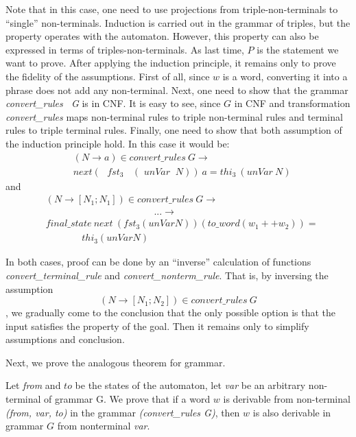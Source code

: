 Note that in this case, one need to use projections from triple-non-terminals to ``single'' non-terminals. Induction is carried out in the grammar of triples, but the property operates with the automaton. However, this property can also be expressed in terms of triples-non-terminals.
As last time, $P$ is the statement we want to prove.
After applying the induction principle, it remains only to prove the fidelity of the assumptions.
First of all, since $ w $ is a word, converting it into a phrase does not add any non-terminal.
Next, one need to show that the grammar \textit{convert\_rules \ G} is in CNF. It is easy to see, since $G$ in CNF and transformation \textit{convert\_rules} maps non-terminal rules to triple non-terminal rules and terminal rules to triple terminal rules.
Finally, one need to show that both assumption of the induction principle hold.  
In this case it would be: 
\begin{align*}
& (N \to a) \in \textit{convert\_rules} \ G \to \ \ \ \ \ \ \ \ \ \ \ \ \ \ \ \ \ \ \ \ \ \ \ \\
& next (\textit{ $fst_{3}$ } \ (\textit{ unVar } \ N)) \ a = \textit{$thi_3$} \ (\textit{unVar} \ N) 
\end{align*}
and 
\begin{align*}
& (N \to [N_1; N_1]) \in \textit{convert\_rules} \ G  \to \\
& \ \ \ \ \ \ \ \ \ \ \ \ \ \ \ \ \ \ \ \ \ \ \ \ \ \ \ \ \ \ \ \ \ \ \ \ \ \ \ \ \ \ \ \ \ \ \ \ \ \ \ ... \to \\
& \textit{final\_state} \ \textit{next} \ (fst_3 (unVar N)) (to\_word (w_1 ++ w_2)) = \\
& \ \ \ \ \ \ \ \ \ \ \ \ \ \ \ \ \ thi_3 (unVar N)
\end{align*}

In both cases, proof can be done by an ``inverse'' calculation of functions \textit{convert\_terminal\_rule} and \textit{convert\_nonterm\_rule}. 
That is, by inversing the assumption $$ (N \to [N_1; N_2]) \in \textit{convert\_rules} \ G$$, we gradually come to the conclusion that the only possible option is that the input satisfies the property of the goal. Then it remains only to simplify assumptions and conclusion.


Next, we prove the analogous theorem for grammar.

\begin{theorem}
	Let \textit{from} and $to$ be the states of the automaton, let \textit{var} be an arbitrary non-terminal of grammar G. We prove that if a word $w$ is derivable from non-terminal \textit{(from, var, to)} in the grammar \textit{(convert\_rules G)}, then $w$ is also derivable in grammar $G$ from nonterminal \textit{var}.
\end{theorem}

